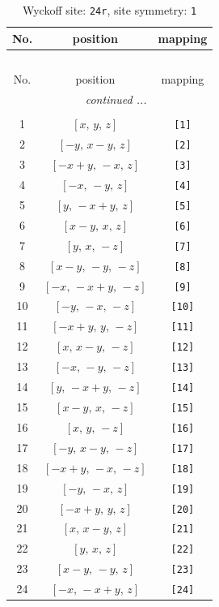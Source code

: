 \documentclass[fleqn,8pt]{jsarticle}
\begin{document}
\begin{longtable}{ccc}
\caption{Wyckoff site: {\tt 24r}, site symmetry: {\tt 1}}
 \\
 \hline \hline
No. & position & mapping \\ \hline \endfirsthead

\multicolumn{2}{l}{\tablename\ \thetable{}} \\
 \hline \hline
No. & position & mapping \\ \hline \endhead

 \hline \hline
\multicolumn{2}{r}{\footnotesize\it continued ...} \\ \endfoot

 \hline \hline
\multicolumn{2}{r}{} \\ \endlastfoot

1 & $\left[ x,\, y,\, z \right]$ & {\tt [1]} \\ \hline
2 & $\left[ - y,\, x - y,\, z \right]$ & {\tt [2]} \\ \hline
3 & $\left[ - x + y,\, - x,\, z \right]$ & {\tt [3]} \\ \hline
4 & $\left[ - x,\, - y,\, z \right]$ & {\tt [4]} \\ \hline
5 & $\left[ y,\, - x + y,\, z \right]$ & {\tt [5]} \\ \hline
6 & $\left[ x - y,\, x,\, z \right]$ & {\tt [6]} \\ \hline
7 & $\left[ y,\, x,\, - z \right]$ & {\tt [7]} \\ \hline
8 & $\left[ x - y,\, - y,\, - z \right]$ & {\tt [8]} \\ \hline
9 & $\left[ - x,\, - x + y,\, - z \right]$ & {\tt [9]} \\ \hline
10 & $\left[ - y,\, - x,\, - z \right]$ & {\tt [10]} \\ \hline
11 & $\left[ - x + y,\, y,\, - z \right]$ & {\tt [11]} \\ \hline
12 & $\left[ x,\, x - y,\, - z \right]$ & {\tt [12]} \\ \hline
13 & $\left[ - x,\, - y,\, - z \right]$ & {\tt [13]} \\ \hline
14 & $\left[ y,\, - x + y,\, - z \right]$ & {\tt [14]} \\ \hline
15 & $\left[ x - y,\, x,\, - z \right]$ & {\tt [15]} \\ \hline
16 & $\left[ x,\, y,\, - z \right]$ & {\tt [16]} \\ \hline
17 & $\left[ - y,\, x - y,\, - z \right]$ & {\tt [17]} \\ \hline
18 & $\left[ - x + y,\, - x,\, - z \right]$ & {\tt [18]} \\ \hline
19 & $\left[ - y,\, - x,\, z \right]$ & {\tt [19]} \\ \hline
20 & $\left[ - x + y,\, y,\, z \right]$ & {\tt [20]} \\ \hline
21 & $\left[ x,\, x - y,\, z \right]$ & {\tt [21]} \\ \hline
22 & $\left[ y,\, x,\, z \right]$ & {\tt [22]} \\ \hline
23 & $\left[ x - y,\, - y,\, z \right]$ & {\tt [23]} \\ \hline
24 & $\left[ - x,\, - x + y,\, z \right]$ & {\tt [24]} \\
\end{longtable}
\end{document}
